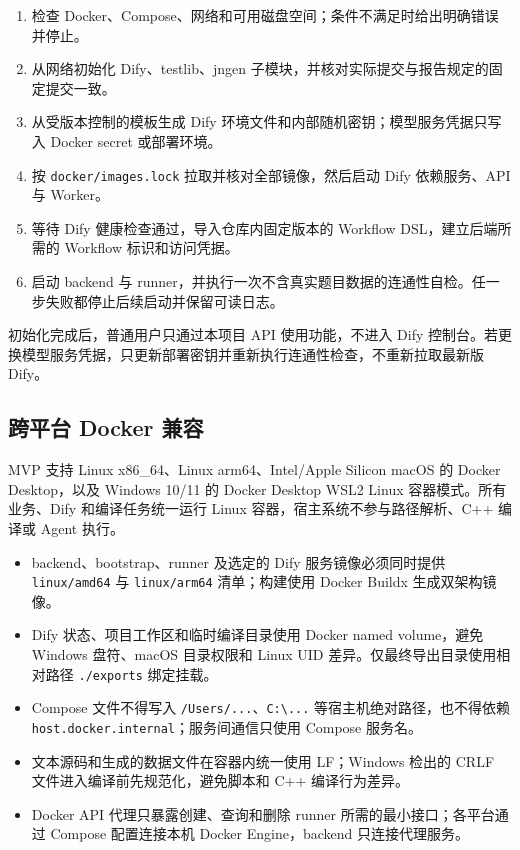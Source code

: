 \documentclass[UTF8,zihao=-4]{ctexart}
\begin{document}
\begin{enumerate}
  \item 检查 Docker、Compose、网络和可用磁盘空间；条件不满足时给出明确错误并停止。
  \item 从网络初始化 Dify、testlib、jngen 子模块，并核对实际提交与报告规定的固定提交一致。
  \item 从受版本控制的模板生成 Dify 环境文件和内部随机密钥；模型服务凭据只写入 Docker secret 或部署环境。
  \item 按 \texttt{docker/images.lock} 拉取并核对全部镜像，然后启动 Dify 依赖服务、API 与 Worker。
  \item 等待 Dify 健康检查通过，导入仓库内固定版本的 Workflow DSL，建立后端所需的 Workflow 标识和访问凭据。
  \item 启动 backend 与 runner，并执行一次不含真实题目数据的连通性自检。任一步失败都停止后续启动并保留可读日志。
\end{enumerate}

初始化完成后，普通用户只通过本项目 API 使用功能，不进入 Dify 控制台。若更换模型服务凭据，只更新部署密钥并重新执行连通性检查，不重新拉取最新版 Dify。

\subsection{跨平台 Docker 兼容}

MVP 支持 Linux x86\_64、Linux arm64、Intel/Apple Silicon macOS 的 Docker Desktop，以及 Windows 10/11 的 Docker Desktop WSL2 Linux 容器模式。所有业务、Dify 和编译任务统一运行 Linux 容器，宿主系统不参与路径解析、C++ 编译或 Agent 执行。

\begin{itemize}
  \item backend、bootstrap、runner 及选定的 Dify 服务镜像必须同时提供 \texttt{linux/amd64} 与 \texttt{linux/arm64} 清单；构建使用 Docker Buildx 生成双架构镜像。
  \item Dify 状态、项目工作区和临时编译目录使用 Docker named volume，避免 Windows 盘符、macOS 目录权限和 Linux UID 差异。仅最终导出目录使用相对路径 \texttt{./exports} 绑定挂载。
  \item Compose 文件不得写入 \texttt{/Users/...}、\texttt{C:\textbackslash...} 等宿主机绝对路径，也不得依赖 \texttt{host.docker.internal}；服务间通信只使用 Compose 服务名。
  \item 文本源码和生成的数据文件在容器内统一使用 LF；Windows 检出的 CRLF 文件进入编译前先规范化，避免脚本和 C++ 编译行为差异。
  \item Docker API 代理只暴露创建、查询和删除 runner 所需的最小接口；各平台通过 Compose 配置连接本机 Docker Engine，backend 只连接代理服务。
\end{itemize}
\end{document}
